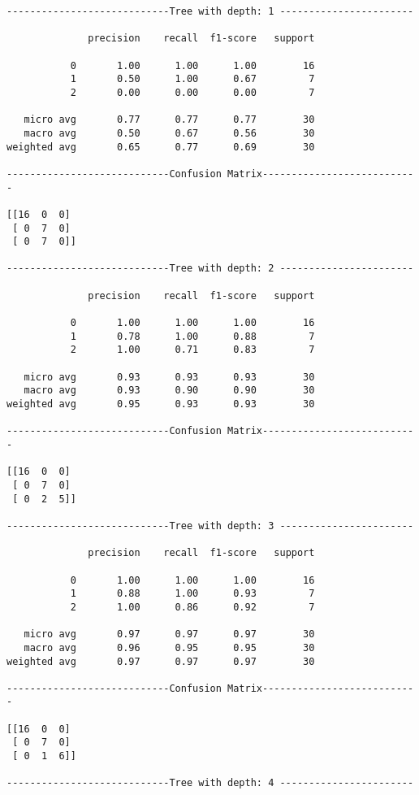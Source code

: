\documentclass[11pt]{article}
\begin{document}
    \begin{Verbatim}[commandchars=\\\{\}]
----------------------------Tree with depth: 1 -----------------------

              precision    recall  f1-score   support

           0       1.00      1.00      1.00        16
           1       0.50      1.00      0.67         7
           2       0.00      0.00      0.00         7

   micro avg       0.77      0.77      0.77        30
   macro avg       0.50      0.67      0.56        30
weighted avg       0.65      0.77      0.69        30

----------------------------Confusion Matrix---------------------------

[[16  0  0]
 [ 0  7  0]
 [ 0  7  0]]

----------------------------Tree with depth: 2 -----------------------

              precision    recall  f1-score   support

           0       1.00      1.00      1.00        16
           1       0.78      1.00      0.88         7
           2       1.00      0.71      0.83         7

   micro avg       0.93      0.93      0.93        30
   macro avg       0.93      0.90      0.90        30
weighted avg       0.95      0.93      0.93        30

----------------------------Confusion Matrix---------------------------

[[16  0  0]
 [ 0  7  0]
 [ 0  2  5]]

----------------------------Tree with depth: 3 -----------------------

              precision    recall  f1-score   support

           0       1.00      1.00      1.00        16
           1       0.88      1.00      0.93         7
           2       1.00      0.86      0.92         7

   micro avg       0.97      0.97      0.97        30
   macro avg       0.96      0.95      0.95        30
weighted avg       0.97      0.97      0.97        30

----------------------------Confusion Matrix---------------------------

[[16  0  0]
 [ 0  7  0]
 [ 0  1  6]]

----------------------------Tree with depth: 4 -----------------------


\end{Verbatim}
\end{document}

